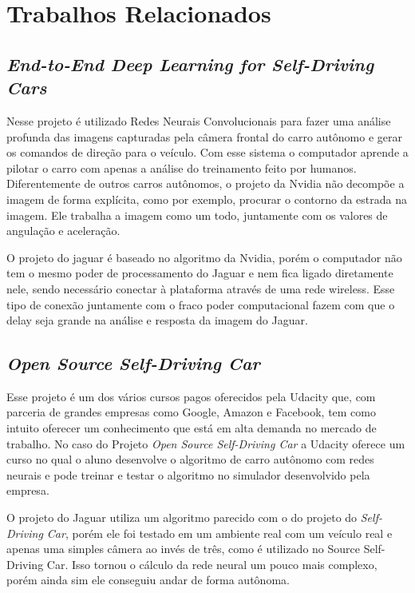 \chapter{Trabalhos Relacionados}
\label{cap:trabalhos-relacionados}

\section{\textit{End-to-End Deep Learning for Self-Driving Cars}}

Nesse projeto é utilizado Redes Neurais Convolucionais para fazer uma análise profunda das imagens capturadas pela câmera frontal do carro autônomo e gerar os comandos de direção para o veículo. Com esse sistema o computador aprende a pilotar o carro com apenas a análise do treinamento feito por humanos. Diferentemente de outros carros autônomos, o projeto da Nvidia não decompõe a imagem de forma explícita, como por exemplo, procurar o contorno da estrada na imagem. Ele trabalha a imagem como um todo, juntamente com os valores de angulação e aceleração. \cite{nvidiabojarski2016end}

O projeto do jaguar é baseado no algoritmo da Nvidia, porém o computador não tem o mesmo poder de processamento do Jaguar e nem fica ligado diretamente nele, sendo necessário conectar à plataforma através de uma rede wireless. Esse tipo de conexão juntamente com o fraco poder computacional fazem com que o delay seja grande na análise e resposta da imagem do Jaguar.

\section{\textit{Open Source Self-Driving Car}}

Esse projeto é um dos vários cursos pagos oferecidos pela Udacity que, com parceria de grandes empresas como Google, Amazon e Facebook, tem como intuito oferecer um conhecimento que está em alta demanda no mercado de trabalho. No caso do Projeto \textit{Open Source Self-Driving Car} a Udacity oferece um curso no qual o aluno desenvolve o algoritmo de carro autônomo com redes neurais e pode treinar e testar o algoritmo no simulador desenvolvido pela empresa. \cite{self-drivingcar} 

O projeto do Jaguar utiliza um algoritmo parecido com o do projeto do \textit{Self-Driving Car}, porém ele foi testado em um ambiente real com um veículo real e apenas uma simples câmera ao invés de três, como é utilizado no Source Self-Driving Car. Isso tornou o cálculo da rede neural um pouco mais complexo, porém ainda sim ele conseguiu andar de forma autônoma.

